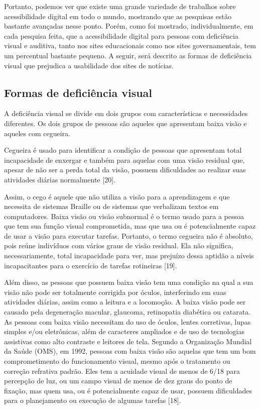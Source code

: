 \documentclass[a4paper]{article}
\begin{document}
\begin{titlepage}
Portanto, podemos ver que existe uma grande variedade de trabalhos sobre acessibilidade digital em todo o mundo, mostrando que as pesquisas estão bastante avançadas nesse ponto. Porém, como foi mostrado, individualmente, em cada pesquisa feita, que a acessibilidade digital para pessoas com deficiência visual e auditiva, tanto nos sites educacionais como nos sites governamentais, tem um percentual bastante pequeno. A seguir, será descrito as formas de deficiência visual que prejudica a usabilidade dos sites de notícias.

\subsection{Formas de deficiência visual}
A deficiência visual se divide em dois grupos com características e necessidades diferentes. Os dois grupos de pessoas são aqueles que apresentam baixa visão e aqueles com cegueira.

Cegueira é usado para identificar a condição de pessoas que apresentam total incapacidade de enxergar e também para aquelas com uma visão residual que, apesar de não ser a perda total da visão, possuem dificuldades ao realizar suas atividades diárias normalmente [20].

Assim, o cego é aquele que não utiliza a visão para a aprendizagem e que necessita de sistemas Braille ou de sistemas que verbalizam textos em computadores. Baixa visão ou visão subnormal é o termo usado para a pessoa que tem sua função visual comprometida, mas que usa ou é potencialmente capaz de usar a visão para executar tarefas. Portanto, o termo cegueira não é absoluto, pois reúne indivíduos com vários graus de visão residual. Ela não significa, necessariamente, total incapacidade para ver, mas prejuízo dessa aptidão a níveis incapacitantes para o exercício de tarefas rotineiras [19].

Além disso, as pessoas que possuem baixa visão tem uma condição na qual a sua visão não pode ser totalmente corrigida por óculos, interferindo em suas atividades diárias, assim como a leitura e a locomoção. A baixa visão pode ser causado pela degeneração macular, glaucoma, retinopatia diabética ou catarata. As pessoas com baixa visão necessitam do uso de óculos, lentes corretivas, lupas simples e/ou eletrônicas, além de caracteres ampliados e de uso de tecnologias assistivas como alto contraste e leitores de tela. Segundo a Organização Mundial da Saúde (OMS), em 1992, pessoas com baixa visão são aquelas que tem um bom comprometimento do funcionamento visual, mesmo após o tratamento ou correção refrativa padrão. Eles tem a acuidade visual de menos de 6/18 para percepção de luz, ou um campo visual de menos de dez graus do ponto de fixação, mas quem usa, ou é potencialmente capaz de usar, possuem dificuldades para o planejamento ou execução de algumas tarefas [18].


\end{titlepage}
\end{document}
